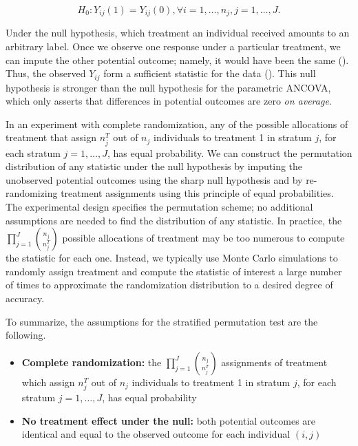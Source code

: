 \documentclass[12pt]{article}
\begin{document}
$$H_0: Y_{ij}(1) = Y_{ij}(0), \forall i = 1, \dots, n_j, j = 1,\dots, J.$$

Under the null hypothesis, which treatment an individual received amounts to an arbitrary label.
Once we observe one response under a particular treatment, we can impute the other potential outcome; namely, it would have been the same  (\cite{rosenbaum_covariance_2002}).
Thus, the observed $Y_{ij}$ form a sufficient statistic for the data (\cite{pesarin_permutation_2010}).
This null hypothesis is stronger than the null hypothesis for the parametric ANCOVA, which only asserts that differences in potential outcomes are zero \textit{on average}.

In an experiment with complete randomization, any of the possible allocations of treatment that assign $n_j^T$ out of $n_j$ individuals to treatment 1 in stratum $j$, for each stratum $j=1,\dots,J$, has equal probability.
We can construct the permutation distribution of any statistic under the null hypothesis by imputing the unobserved potential outcomes using the sharp null hypothesis and by re-randomizing treatment assignments using this principle of equal probabilities.
The experimental design specifies the permutation scheme; no additional assumptions are needed to find the distribution of any statistic.
In practice, the $\prod_{j=1}^J {n_j \choose n_j^T}$ possible allocations of treatment may be too numerous to compute the statistic for each one.
Instead, we typically use Monte Carlo simulations to randomly assign treatment and compute the statistic of interest a large number of times to approximate the randomization distribution to a desired degree of accuracy.

To summarize, the assumptions for the stratified permutation test are the following.
\begin{itemize}
\item \textbf{Complete randomization:} the $\prod_{j=1}^J {n_j \choose n_j^T}$ assignments of treatment which assign $n_j^T$ out of $n_j$ individuals to treatment 1 in stratum $j$, for each stratum $j=1,\dots,J$, has equal probability
\item \textbf{No treatment effect under the null:} both potential outcomes are identical and equal to the observed outcome for each individual $(i, j)$
\end{itemize}
\end{document}
